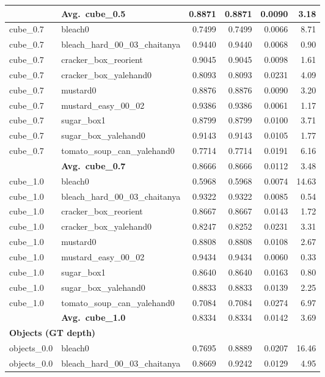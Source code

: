 \begin{longtable}{llrrrr}
  & \textbf{Avg.~cube_0.5} & 0.8871 & 0.8871 & 0.0090 & 3.18 \\
  \midrule
  cube_0.7 & bleach0 & 0.7499 & 0.7499 & 0.0066 & 8.71 \\
  cube_0.7 & bleach\_hard\_00\_03\_chaitanya & 0.9440 & 0.9440 & 0.0068 & 0.90 \\
  cube_0.7 & cracker\_box\_reorient & 0.9045 & 0.9045 & 0.0098 & 1.61 \\
  cube_0.7 & cracker\_box\_yalehand0 & 0.8093 & 0.8093 & 0.0231 & 4.09 \\
  cube_0.7 & mustard0 & 0.8876 & 0.8876 & 0.0090 & 3.20 \\
  cube_0.7 & mustard\_easy\_00\_02 & 0.9386 & 0.9386 & 0.0061 & 1.17 \\
  cube_0.7 & sugar\_box1 & 0.8799 & 0.8799 & 0.0100 & 3.71 \\
  cube_0.7 & sugar\_box\_yalehand0 & 0.9143 & 0.9143 & 0.0105 & 1.77 \\
  cube_0.7 & tomato\_soup\_can\_yalehand0 & 0.7714 & 0.7714 & 0.0191 & 6.16 \\
  \cmidrule{2-6}
  & \textbf{Avg.~cube_0.7} & 0.8666 & 0.8666 & 0.0112 & 3.48 \\
  \midrule
  cube_1.0 & bleach0 & 0.5968 & 0.5968 & 0.0074 & 14.63 \\
  cube_1.0 & bleach\_hard\_00\_03\_chaitanya & 0.9322 & 0.9322 & 0.0085 & 0.54 \\
  cube_1.0 & cracker\_box\_reorient & 0.8667 & 0.8667 & 0.0143 & 1.72 \\
  cube_1.0 & cracker\_box\_yalehand0 & 0.8247 & 0.8252 & 0.0231 & 3.31 \\
  cube_1.0 & mustard0 & 0.8808 & 0.8808 & 0.0108 & 2.67 \\
  cube_1.0 & mustard\_easy\_00\_02 & 0.9434 & 0.9434 & 0.0060 & 0.33 \\
  cube_1.0 & sugar\_box1 & 0.8640 & 0.8640 & 0.0163 & 0.80 \\
  cube_1.0 & sugar\_box\_yalehand0 & 0.8833 & 0.8833 & 0.0139 & 2.25 \\
  cube_1.0 & tomato\_soup\_can\_yalehand0 & 0.7084 & 0.7084 & 0.0274 & 6.97 \\
  \cmidrule{2-6}
  & \textbf{Avg.~cube_1.0} & 0.8334 & 0.8334 & 0.0142 & 3.69 \\
  \midrule
\multicolumn{6}{l}{\textbf{Objects (GT depth)}} \\
\midrule
  objects_0.0 & bleach0 & 0.7695 & 0.8889 & 0.0207 & 16.46 \\
  objects_0.0 & bleach\_hard\_00\_03\_chaitanya & 0.8669 & 0.9242 & 0.0129 & 4.95 \\

\end{longtable}
